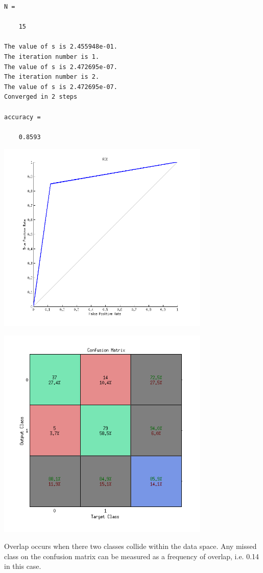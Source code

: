 \documentclass[12pt,letterpaper]{article}
\begin{document}
        \color{lightgray} \begin{verbatim}
N =

    15

The value of s is 2.455948e-01.
The iteration number is 1.
The value of s is 2.472695e-07.
The iteration number is 2.
The value of s is 2.472695e-07.
Converged in 2 steps

accuracy =

    0.8593

\end{verbatim} \color{black}
    
\includegraphics [width=4in]{HW3_VSViROC.png}

\includegraphics [width=4in]{HW3_VSViCM.png}

Overlap occurs when there two classes collide within the data space. Any missed class on the confusion matrix can be measured as a frequency of overlap, i.e. 0.14  in this case.
\end{document}
